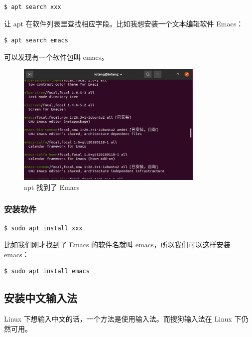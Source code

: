 \documentclass[UTF-8]{ctexart}
\begin{document}
				\begin{verbatim}
$ apt search xxx
				\end{verbatim}
			
				让 apt 在软件列表里查找相应字段。比如我想安装一个文本编辑软件 Emacs：
				
				\begin{verbatim}
$ apt search emacs
				\end{verbatim}
			
				可以发现有一个软件包叫 emacs。
				
				\begin{figure}[H]
					\centering
					\includegraphics[width=0.8\textwidth]{fig/apt_find_emacs.png}
					\caption*{apt 找到了 Emacs}
				\end{figure}

			\subsubsection{安装软件}
		
				\begin{verbatim}
$ sudo apt install xxx
				\end{verbatim}
				
				比如我们刚才找到了 Emacs 的软件名就叫 emacs，所以我们可以这样安装 emacs：
				
				\begin{verbatim}
$ sudo apt install emacs
				\end{verbatim}
			
		\subsection{安装中文输入法}
		
			Linux 下想输入中文的话，一个方法是使用输入法。而搜狗输入法在 Linux 下仍然可用。
			
\end{document}
